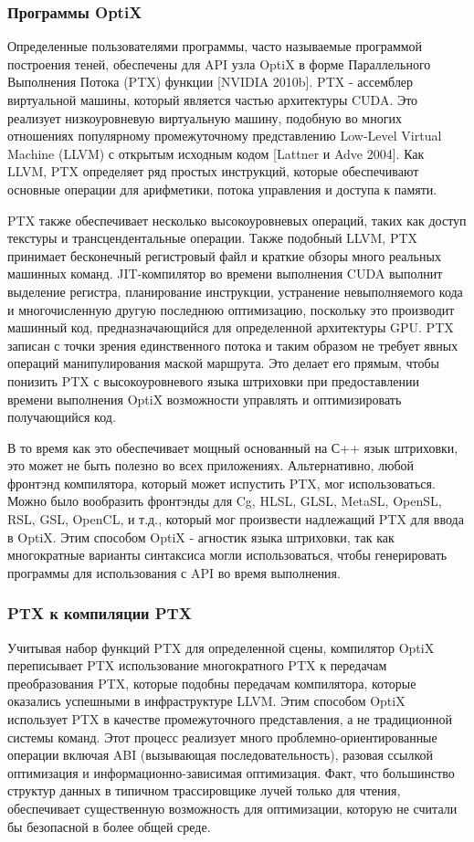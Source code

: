 \subsubsection{Программы OptiX}
Определенные пользователями программы, часто называемые программой построения теней, обеспечены для API узла OptiX в форме Параллельного Выполнения Потока (PTX) функции [NVIDIA 2010b]. PTX - ассемблер виртуальной машины, который является частью архитектуры CUDA. Это реализует низкоуровневую виртуальную машину, подобную во многих отношениях популярному промежуточному представлению Low-Level Virtual Machine (LLVM) с открытым исходным кодом [Lattner и Adve 2004]. Как LLVM, PTX определяет ряд простых инструкций, которые обеспечивают основные операции для арифметики, потока управления и доступа к памяти. 

PTX также обеспечивает несколько высокоуровневых операций, таких как доступ текстуры и трансцендентальные операции. Также подобный LLVM, PTX принимает бесконечный регистровый файл и краткие обзоры много реальных машинных команд. JIT-компилятор во времени выполнения CUDA выполнит выделение регистра, планирование инструкции, устранение невыполняемого кода и многочисленную другую последнюю оптимизацию, поскольку это производит машинный код, предназначающийся для определенной архитектуры GPU.
PTX записан с точки зрения единственного потока и таким образом не требует явных операций манипулирования маской маршрута. Это делает его прямым, чтобы понизить PTX с высокоуровневого языка штриховки при предоставлении времени выполнения OptiX возможности управлять и оптимизировать получающийся код.

  В то время как это обеспечивает мощный основанный на С++ язык штриховки, это может не быть полезно во всех приложениях. Альтернативно, любой фронтэнд компилятора, который может испустить PTX, мог использоваться. Можно было вообразить фронтэнды для Cg, HLSL, GLSL, MetaSL, OpenSL, RSL, GSL, OpenCL, и т.д., который мог произвести надлежащий PTX для ввода в OptiX. Этим способом OptiX - агностик языка штриховки, так как многократные варианты синтаксиса могли использоваться, чтобы генерировать программы для использования с API во время выполнения.
\subsubsection{PTX к компиляции PTX}
Учитывая набор функций PTX для определенной сцены, компилятор OptiX переписывает PTX использование многократного PTX к передачам преобразования PTX, которые подобны передачам компилятора, которые оказались успешными в инфраструктуре LLVM. Этим способом OptiX использует PTX в качестве промежуточного представления, а не традиционной системы команд. Этот процесс реализует много проблемно-ориентированные операции включая ABI (вызывающая последовательность), разовая ссылкой оптимизация и информационно-зависимая оптимизация. Факт, что большинство структур данных в типичном трассировщике лучей только для чтения, обеспечивает существенную возможность для оптимизации, которую не считали бы безопасной в более общей среде.
